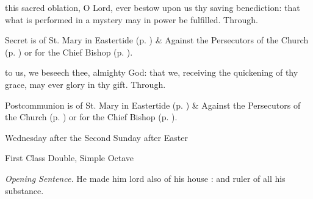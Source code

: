 \secret\label{EasterIISecret}
 this sacred oblation, O Lord, ever bestow upon us thy saving benediction: that what is performed in a mystery may in power be fulfilled. Through.
\begin{rubric}
     Secret is of St. Mary in Eastertide (p. \pageref{SPMaryInEaster}) \&  Against the Persecutors of the Church (p. \pageref{SPAgainst}) or for the Chief Bishop (p. \pageref{SPChiefBishop}).
\end{rubric}
\postcommunion\label{EasterIIPostcommunion}
 to us, we beseech thee, almighty God: that we, receiving the quickening of thy grace, may ever glory in thy gift. Through.
\begin{rubric}
     Postcommunion is of St. Mary in Eastertide (p. \pageref{SPMaryInEaster}) \&  Against the Persecutors of the Church (p. \pageref{SPAgainst}) or for the Chief Bishop (p. \pageref{SPChiefBishop}).
\end{rubric}

\begin{inhead}
    {Wednesday after the Second Sunday after Easter}\par
    {First Class Double, Simple Octave}
\end{inhead}
\par\noindent
\textit{Opening Sentence.} He made him lord also of his house : and ruler of all his substance.




